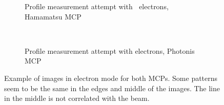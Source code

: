 \begin{figure}[!ht]
	\begin{subfigure}[t]{0.5\textwidth}
		
		\caption{Profile measurement attempt with $\ $ electrons, Hamamatsu MCP}
		\label{}
	\end{subfigure}
	~
	\begin{subfigure}[t]{0.5\textwidth}
		
		\caption{Profile measurement attempt with electrons, Photonis MCP}
		\label{}
	\end{subfigure}
	\caption[Example of images in electron mode]{Example of images in electron mode for both MCPs.
  Some patterns seem to be the same in the edges and middle of the images.
  The line in the middle is not correlated with the beam.}
	\label{chap4:electron_MCP}
\end{figure}
